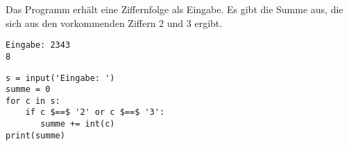 \question[4]

Das Programm erhält eine Ziffernfolge als Eingabe.
Es gibt die Summe aus, die sich aus den vorkommenden Ziffern 2 und 3 ergibt.

\begin{lstlisting}
Eingabe: 2343
8
\end{lstlisting}

\begin{solutionbox}{5cm}
\begin{lstlisting}
s = input('Eingabe: ')
summe = 0
for c in s:
    if c $==$ '2' or c $==$ '3':
       summe += int(c)
print(summe)
\end{lstlisting}
\end{solutionbox}
